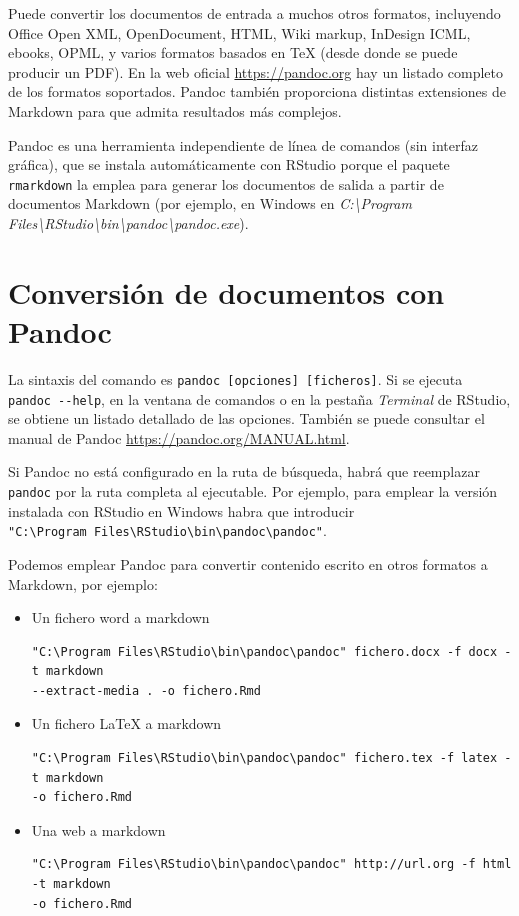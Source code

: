 \documentclass[]{book}
\theoremstyle{definition}
\theoremstyle{definition}
\theoremstyle{definition}
\theoremstyle{remark}
\begin{document}
Puede convertir los documentos de entrada a muchos otros formatos,
incluyendo Office Open XML, OpenDocument, HTML, Wiki markup, InDesign
ICML, ebooks, OPML, y varios formatos basados en TeX (desde donde se
puede producir un PDF). En la web oficial \url{https://pandoc.org} hay
un listado completo de los formatos soportados. Pandoc también
proporciona distintas extensiones de Markdown para que admita resultados
más complejos.

Pandoc es una herramienta independiente de línea de comandos (sin
interfaz gráfica), que se instala automáticamente con RStudio porque el
paquete \texttt{rmarkdown} la emplea para generar los documentos de
salida a partir de documentos Markdown (por ejemplo, en Windows en
\emph{C:\textbackslash{}Program
Files\textbackslash{}RStudio\textbackslash{}bin\textbackslash{}pandoc\textbackslash{}pandoc.exe}).

\section{Conversión de documentos con Pandoc}\label{conversion}

La sintaxis del comando es
\texttt{pandoc\ {[}opciones{]}\ {[}ficheros{]}}. Si se ejecuta
\texttt{pandoc\ -\/-help}, en la ventana de comandos o en la pestaña
\emph{Terminal} de RStudio, se obtiene un listado detallado de las
opciones. También se puede consultar el manual de Pandoc
\url{https://pandoc.org/MANUAL.html}.

Si Pandoc no está configurado en la ruta de búsqueda, habrá que
reemplazar \texttt{pandoc} por la ruta completa al ejecutable. Por
ejemplo, para emplear la versión instalada con RStudio en Windows habra
que introducir
\texttt{"C:\textbackslash{}Program\ Files\textbackslash{}RStudio\textbackslash{}bin\textbackslash{}pandoc\textbackslash{}pandoc"}.

Podemos emplear Pandoc para convertir contenido escrito en otros
formatos a Markdown, por ejemplo:

\begin{itemize}
\item
  Un fichero word a markdown

\begin{verbatim}
"C:\Program Files\RStudio\bin\pandoc\pandoc" fichero.docx -f docx -t markdown 
--extract-media . -o fichero.Rmd 
\end{verbatim}
\item
  Un fichero LaTeX a markdown

\begin{verbatim}
"C:\Program Files\RStudio\bin\pandoc\pandoc" fichero.tex -f latex -t markdown 
-o fichero.Rmd 
\end{verbatim}
\item
  Una web a markdown

\begin{verbatim}
"C:\Program Files\RStudio\bin\pandoc\pandoc" http://url.org -f html -t markdown 
-o fichero.Rmd
\end{verbatim}
\end{itemize}
\end{document}
